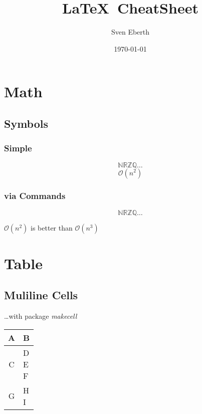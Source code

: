 \documentclass[a4paper, 11pt]{article}
\title{\LaTeX~CheatSheet}
\author{Sven Eberth}
\date{\today}
\begin{document}
    \maketitle
    \tableofcontents
    \newpage
	\hypersetup{linkcolor=red}  %
	
	\section{Math}\label{sec:math}
		\subsection{Symbols}
			\subsubsection{Simple}
		    \[ \mathbb{N R Z Q} \ldots \]
		    \[ \mathcal{O}(n^2) \]
		
		    \subsubsection{via Commands}
		    \newcommand{\N}[0]{\mathbb{N}}
		    \newcommand{\R}[0]{\mathbb{R}}
		    \newcommand{\Z}[0]{\mathbb{Z}}
		    \newcommand{\Q}[0]{\mathbb{Q}}
		    
		    \newcommand{\bigO}[1]{\ensuremath{\mathcal{O}(#1)}}
		
		    \[ \N \R \Z \Q \ldots \]
		    \begin{center}
				\bigO{n^2} is better than $\bigO{n^3}$
			\end{center}


    \section{Table}\label{sec:table}
		\subsection{Muliline Cells}
			\ldots with package \textit{makecell}
			
			\begin{tabular}{cl}
				A		& B  \\
				\hline
				C		& \makecell[tl]{D \\ E \\ F} \\
				\hline
				G		& \makecell[tr]{H \\ I}
		    \end{tabular}
	    
\end{document}
